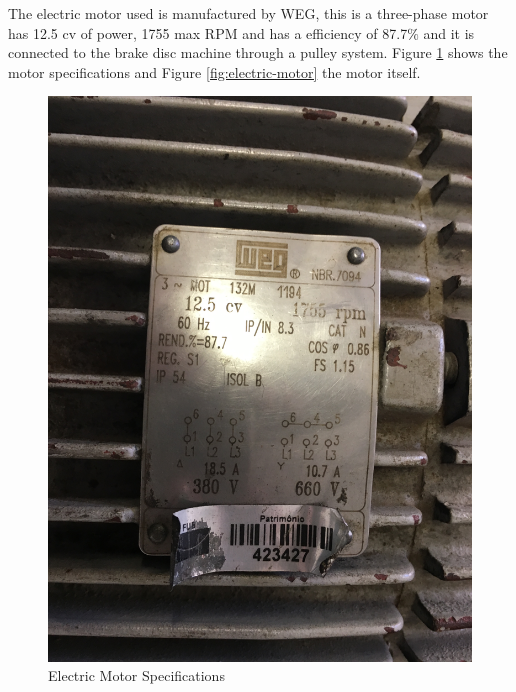 		The electric motor used is manufactured by WEG, this is a three-phase motor has 12.5 cv of power, 1755 max RPM and has a efficiency of 87.7$\%$ and it is connected to the brake disc machine through a pulley system. Figure \ref{fig:electric-motor-specs} shows the motor specifications and Figure \ref{fig:electric-motor} the motor itself.

		\begin{figure}[htbp]
			\centering
			\includegraphics[scale=0.05]{figuras/fig-electric-motor-specs}
			\caption{Electric Motor Specifications}
			\label{fig:electric-motor-specs}
		\end{figure}

